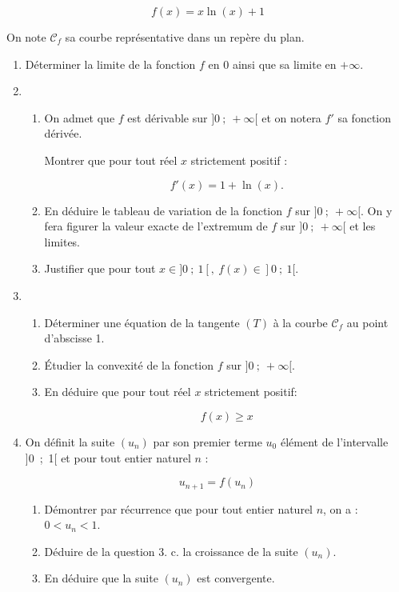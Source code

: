 \documentclass[11pt,a4paper,french]{article}
\begin{document}
\[f(x) = x\ln (x) + 1\]

On note $\mathcal{C}_f$ sa courbe représentative dans un repère du plan.

\medskip

\begin{enumerate}
\item Déterminer la limite de la fonction $f$ en $0$ ainsi que sa limite en $+\infty$.
\item 
	\begin{enumerate}
		\item On admet que $f$ est dérivable sur $]0~;~+\infty[$ et on notera $f'$ sa fonction dérivée.
		
Montrer que pour tout réel $x$ strictement positif : 

\[f'(x) = 1 + \ln (x).\]

		\item En déduire le tableau de variation de la fonction $f$ sur $]0~;~ +\infty[$. On y fera figurer la valeur exacte de l'extremum de $f$ sur $]0~;~ +\infty[$ et les limites.
		\item Justifier que pour tout $x \in  ]0~;~1[,\:f(x) \in  ]0~;~1[$.
	\end{enumerate}	
\item 
	\begin{enumerate}
		\item Déterminer une équation de la tangente $(T)$ à la courbe $\mathcal{C}_f$ au point d'abscisse 1.
		\item Étudier la convexité de la fonction $f$ sur $]0~;~+\infty[$.
		\item En déduire que pour tout réel $x$ strictement positif: 
		
		\[f(x) \geqslant x\]
		
	\end{enumerate}
\item On définit la suite $\left(u_n\right)$ par son premier terme $u_0$ élément de l'intervalle ]0~;~1[ et pour tout entier naturel $n$ :

\[u_{n+1} = f\left(u_n\right)\]

	\begin{enumerate}
		\item Démontrer par récurrence que pour tout entier naturel $n$, on a : $0 < u_n < 1$.
		\item Déduire de la question 3. c. la croissance de la suite $\left(u_n\right)$.
		\item En déduire que la suite $\left(u_n\right)$ est convergente.
	\end{enumerate}
\end{enumerate}
\end{document}
